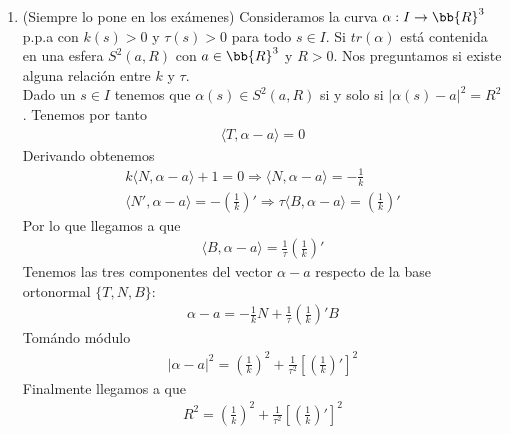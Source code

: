 \begin{ejercicio}
\begin{enumerate}
\begin{align*}
            &= k_0 \langle N_\alpha - N_h , T_\alpha - T_h\rangle - k_0\langle T_\alpha - T_h, N_\alpha-N_h\rangle - \tau_0 \langle B_\alpha - B_h, N_\alpha-N_h \rangle + \tau_0\langle N_\alpha - N_h, B_\alpha - B_h \rangle =\\
            &= 0
        \end{align*}
        Obtenemos por tanto que $f(s_0)=0$ y $f'(s)=0$ para todo $s\in I$ lo que nos dice que $f(s)=0$ para todo $s\in I$. Por la construcción de $f$ tenemos que 
        \begin{gather*}
            \alpha' = T_\alpha = T_h = h' \Rightarrow (\alpha - h)'(s) = 0\ \ \ \ \forall s \in I
        \end{gather*}
        Con la condición de $\alpha(s_0)=h(s_0)$ tenemos que $\alpha(s)=h(s)$ para todo $s\in I$.

        \item (Siempre lo pone en los exámenes) Consideramos la curva $\alpha:I\to \bb{R}^3$ p.p.a con $k(s)>0$ y $\tau(s)>0$ para todo $s\in I$. Si $tr(\alpha)$ está contenida en una esfera $S^2(a,R)$ con $a\in \bb{R}^3$ y $R>0$. Nos preguntamos si existe alguna relación entre $k$ y $\tau$.\\
        
        Dado un $s\in I$ tenemos que $\alpha(s)\in S^2(a,R)$ si y solo si $|\alpha(s) - a|^2 = R^2$. Tenemos por tanto
        \begin{gather*}
            \langle T, \alpha - a \rangle = 0
        \end{gather*}
        Derivando obtenemos 
        \begin{gather*}
            k\langle N , \alpha - a\rangle + 1 = 0 \Rightarrow \langle N, \alpha - a \rangle = - \frac{1}{k}\\
            \langle N', \alpha - a \rangle = - \left(\frac{1}{k}\right)' \Rightarrow \tau \langle B, \alpha -a \rangle = \left(\frac{1}{k}\right)'
        \end{gather*}
        Por lo que llegamos a que
        \begin{gather*}
            \langle B, \alpha -a \rangle = \frac{1}{\tau} \left(\frac{1}{k}\right)'
        \end{gather*}
        Tenemos las tres componentes del vector $\alpha -a$ respecto de la base ortonormal $\{T,N,B\}$:
        \begin{gather*}
            \alpha - a = - \frac{1}{k} N + \frac{1}{\tau} \left(\frac{1}{k}\right)'B
        \end{gather*}
        Tomándo módulo 
        \begin{gather*}
            |\alpha - a|^2 = \left(\frac{1}{k}\right)^2 + \frac{1}{\tau^2} \left[\left(\frac{1}{k}\right)'\right]^2
        \end{gather*} 
        Finalmente llegamos a que 
        \begin{gather*}
            R^2 = \left(\frac{1}{k}\right)^2 + \frac{1}{\tau^2} \left[\left(\frac{1}{k}\right)'\right]^2
        \end{gather*}


\end{enumerate}
\end{ejercicio}
